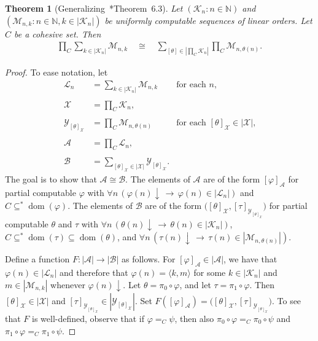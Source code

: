 \documentclass[11pt,a4paper,reqno]{amsart}
\newtheorem{Theorem}{Theorem}[section]
\theoremstyle{definition}
\DeclareMathOperator{\dom}{\mathrm{dom}}
\newcommand{\la}{\langle}
\newcommand{\ra}{\rangle}
\newcommand{\da}{{\downarrow}}
\newcommand{\imp}{\rightarrow}
\newcommand{\iso}{\cong}
\newcommand{\Nb}{\mathbb{N}}
\newcommand{\mc}[1]{\mathcal{#1}}
\begin{document}
\begin{Theorem}[Generalizing~\cite{CohPowJournal}*{Theorem~6.3}]\label{thm-IsoGenSum}
Let $(\mc{K}_n : n \in \Nb)$ and $(\mc{M}_{n,k} : n \in \Nb, k \in |\mc{K}_n|)$ be uniformly computable sequences of linear orders.  Let $C$ be a cohesive set.  Then
\begin{align*}
\prod\nolimits_C \sum_{k \in |\mc{K}_n|}\mc{M}_{n,k} \quad\iso\quad \sum_{[\theta] \in \left|\prod_C \mc{K}_n\right|}\prod\nolimits_C \mc{M}_{n,\theta(n)}.
\end{align*}
\end{Theorem}

\begin{proof}
To ease notation, let
\begin{align*}
\mc{L}_n &= \sum_{k \in |\mc{K}_n|}\mc{M}_{n,k} & \text{for each $n$,}\\ \\
\mc{X} &= \prod\nolimits_C \mc{K}_n,\\ \\
\mc{Y}_{[\theta]_\mc{X}} &= \prod\nolimits_C \mc{M}_{n, \theta(n)} & \text{for each $[\theta]_\mc{X} \in |\mc{X}|$,}\\ \\
\mc{A} &= \prod\nolimits_C \mc{L}_n,\\ \\
\mc{B} &= \sum_{[\theta]_\mc{X} \in |\mc{X}|} \mc{Y}_{[\theta]_\mc{X}}.
\end{align*}
The goal is to show that $\mc{A} \iso \mc{B}$.  The elements of $\mc{A}$ are of the form $[\varphi]_\mc{A}$ for partial computable $\varphi$ with $\forall n \, (\varphi(n)\da \,\imp\, \varphi(n) \in |\mc{L}_n|)$ and $C \subseteq^* \dom(\varphi)$.  The elements of $\mc{B}$ are of the form $\bigl([\theta]_\mc{X}, [\tau]_{\mc{Y}_{[\theta]_\mc{X}}}\bigr)$ for partial computable $\theta$ and $\tau$ with $\forall n \, (\theta(n)\da \,\imp\, \theta(n) \in |\mc{K}_n|)$, $C \subseteq^* \dom(\tau) \subseteq \dom(\theta)$, and $\forall n \, (\tau(n)\da \,\imp\, \tau(n) \in |\mc{M}_{n, \theta(n)}|)$.

Define a function $F \colon |\mc{A}| \imp |\mc{B}|$ as follows.  For $[\varphi]_\mc{A} \in |\mc{A}|$, we have that $\varphi(n) \in |\mc{L}_n|$ and therefore that $\varphi(n) = \la k, m \ra$ for some $k \in |\mc{K}_n|$ and $m \in | \mc{M}_{n,k} |$ whenever $\varphi(n)\da$.  Let $\theta = \pi_0 \circ \varphi$, and let $\tau = \pi_1 \circ \varphi$.  Then $[\theta]_\mc{X} \in |\mc{X}|$ and $[\tau]_{\mc{Y}_{[\theta]_\mc{X}}} \in |\mc{Y}_{[\theta]_\mc{X}}|$.  Set $F([\varphi]_\mc{A}) = \bigl([\theta]_\mc{X}, [\tau]_{\mc{Y}_{[\theta]_\mc{X}}}\bigr)$.  To see that $F$ is well-defined, observe that if $\varphi =_C \psi$, then also $\pi_0 \circ \varphi =_C \pi_0 \circ \psi$ and $\pi_1 \circ \varphi =_C \pi_1 \circ \psi$.


\end{proof}
\end{document}
